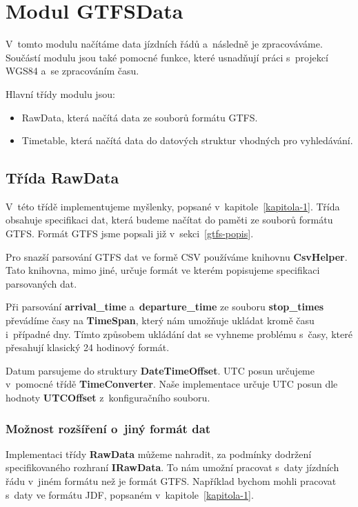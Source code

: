 \section{Modul GTFSData}

V~tomto modulu načítáme data jízdních řádů a~následně je zpracováváme. Součástí modulu jsou také pomocné funkce, které usnadňují práci s~projekcí WGS84 a~se zpracováním času.

Hlavní třídy modulu jsou:
\begin{itemize}
    \item RawData, která načítá data ze souborů formátu GTFS.
    \item Timetable, která načítá data do datových struktur vhodných pro vyhledávání.
\end{itemize}


\subsection{Třída RawData}\label{rawdata}

V~této třídě implementujeme myšlenky, popsané v~kapitole~\ref{kapitola-1}. Třída obsahuje specifikaci dat, která budeme načítat do paměti ze souborů formátu GTFS. Formát GTFS jsme popsali již v~sekci~\ref{gtfs-popis}.

Pro snazší parsování GTFS dat ve formě CSV používáme knihovnu \textbf{CsvHelper}. Tato knihovna, mimo jiné, určuje formát ve kterém popisujeme specifikaci parsovaných dat.

Při parsování \textbf{arrival\_time} a~\textbf{departure\_time} ze souboru \textbf{stop\_times} převádíme časy na \textbf{TimeSpan}, který nám umožňuje ukládat kromě času i~případné dny. Tímto způsobem ukládání dat se vyhneme problému s~časy, které přesahují klasický 24 hodinový formát.

Datum parsujeme do struktury \textbf{DateTimeOffset}. UTC posun určujeme v~pomocné třídě \textbf{TimeConverter}. Naše implementace určuje UTC posun dle hodnoty \textbf{UTCOffset} z~konfiguračního souboru.

\subsubsection{Možnost rozšíření o~jiný formát dat}

Implementaci třídy \textbf{RawData} můžeme nahradit, za podmínky dodržení specifikovaného rozhraní \textbf{IRawData}. To nám umožní pracovat s~daty jízdních řádu v~jiném formátu než je formát GTFS. Například bychom mohli pracovat s~daty ve formátu JDF, popsaném v~kapitole~\ref{kapitola-1}.


